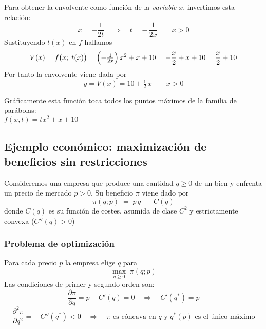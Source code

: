 \documentclass{article}
\begin{document}
Para obtener la envolvente como función de la \emph{variable} \(x\), invertimos esta relación:
\[
x = -\frac{1}{2t}
\quad\Longrightarrow\quad
t = -\,\frac{1}{2x}
\qquad x>0
\]
Sustituyendo \(t(x)\) en \(f\) hallamos
\[
V(x)
= f\bigl(x;\;t(x)\bigr)
= \Bigl(-\tfrac{1}{2x}\Bigr)\,x^2 + x + 10
= -\frac{x}{2} + x + 10
= \frac{x}{2} + 10
\]
Por tanto la envolvente viene dada por
\[
y = V(x) = 10 + \tfrac12\,x
\qquad x>0
\]

Gráficamente esta función toca todos los puntos máximos de la familia de parábolas:\\ $f(x,t)=tx^2+x+10$
\begin{center}
\end{center}


\subsection*{Ejemplo económico: maximización de beneficios sin restricciones}

Consideremos una empresa que produce una cantidad \(q\ge0\) de un bien y enfrenta un precio de mercado \(p>0\). Su beneficio \(\pi\) viene dado por
\[
\pi(q; p) \;=\; p\,q \;-\; C(q)
\]
donde \(C(q)\) es su función de costes, asumida de clase \(C^2\) y estrictamente convexa (\(C''(q)>0\))  

\subsubsection*{Problema de optimización}

Para cada precio \(p\) la empresa elige \(q\) para
\[
\max_{q\ge0}\;\pi(q;p)
\]
Las condiciones de primer y segundo orden son:
\[
\frac{\partial\pi}{\partial q}
= p - C'(q) = 0
\quad\Longrightarrow\quad
C'(q^*)=p
\]
\[
\frac{\partial^2\pi}{\partial q^2}
= -\,C''(q^*) < 0
\quad\Longrightarrow\quad
\text{\(\pi\) es cóncava en \(q\) y \(q^*(p)\) es el único máximo}
\]
\end{document}
